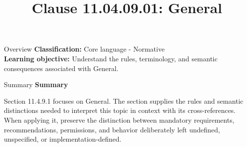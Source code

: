 \documentclass[10pt,letterpaper]{article}
\title{Clause 11.04.09.01: General}
\author{}
\date{}
\begin{document}
\maketitle
\begin{CornellOverviewBox}{Overview}
\textbf{Classification:} Core language - Normative\\[2pt]
\textbf{Learning objective:} Understand the rules, terminology, and semantic consequences associated with General.
\end{CornellOverviewBox}\begin{CornellSummaryBox}{Summary}
{\sffamily\bfseries\color{Accent} Summary}\par\vspace{3pt}Section 11.4.9.1 focuses on General. The section supplies the rules and semantic distinctions needed to interpret this topic in context with its cross-references. When applying it, preserve the distinction between mandatory requirements, recommendations, permissions, and behavior deliberately left undefined, unspecified, or implementation-defined.
\end{CornellSummaryBox}
\end{document}
